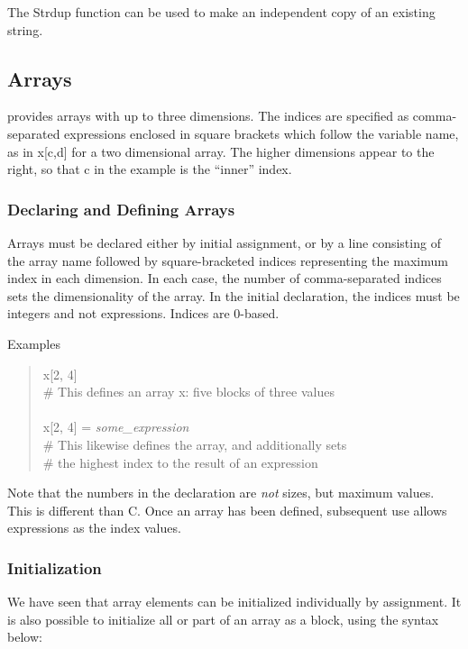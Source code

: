 The {\vt Strdup} function can be used to make an independent copy of
an existing string.

\subsection{Arrays}
\label{arrayvars}

{\Xic} provides arrays with up to three dimensions.  The indices are
specified as comma-separated expressions enclosed in square brackets
which follow the variable name, as in {\vt x[c,d]} for a two
dimensional array.  The higher dimensions appear to the right, so that
{\vt c} in the example is the ``inner'' index.

\subsubsection{Declaring and Defining Arrays}

Arrays must be declared either by initial assignment, or by a line
consisting of the array name followed by square-bracketed indices
representing the maximum index in each dimension.  In each case, the
number of comma-separated indices sets the dimensionality of the
array.  In the initial declaration, the indices must be integers and
not expressions.  Indices are 0-based.

Examples
\begin{quote}\vt
x[2, 4]\\
\# This defines an array x: five blocks of three values\\
\\
x[2, 4] = {\it some\_expression}\\
\# This likewise defines the array, and additionally sets\\
\# the highest index to the result of an expression
\end{quote}

Note that the numbers in the declaration are {\it not} sizes, but
maximum values.  This is different than C.  Once an array has been
defined, subsequent use allows expressions as the index values.

\subsubsection{Initialization}

We have seen that array elements can be initialized individually by
assignment.  It is also possible to initialize all or part of an array
as a block, using the syntax below: 

